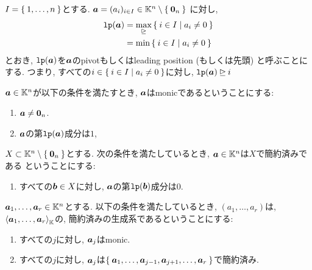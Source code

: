 \begin{definition}
$I=\Set{1,\ldots,n}$とする.
$\boldsymbol{a}=(a_i)_{i\in I}\in \mathbb{K}^n\setminus\Set{\boldsymbol{0}_n}$
に対し,
\begin{align*}
  \operatorname{\texttt{lp}}(\boldsymbol{a})
  &=\max_{\unrhd} \Set{i\in I |a_i\neq 0}\\
  &=\min\Set{i\in I |a_i\neq 0}
\end{align*}
とおき,
$\operatorname{\texttt{lp}}(\boldsymbol{a})$を$\boldsymbol{a}$のpivotもしくはleading position (もしくは先頭)
と呼ぶことにする.
つまり,
すべての$i\in \Set{i\in I |a_i\neq 0}$に対し,
$\operatorname{\texttt{lp}}(\boldsymbol{a})\unrhd i$
\end{definition}

\begin{definition}
  $\boldsymbol{a}\in\mathbb{K}^n$が以下の条件を満たすとき,
  $\boldsymbol{a}$はmonicであるということにする:
  \begin{enumerate}
  \item $\boldsymbol{a}\neq\boldsymbol{0}_n$.
  \item $\boldsymbol{a}$の第$\operatorname{\texttt{lp}}(\boldsymbol{a})$成分は$1$,
  \end{enumerate}
\end{definition}

\begin{definition}
  $X\subset \mathbb{K}^n\setminus\Set{\boldsymbol{0}_n}$とする.
  次の条件を満たしているとき,
  $\boldsymbol{a}\in\mathbb{K}^n$は$X$で簡約済みである
  ということにする:
  \begin{enumerate}
  \item すべての$\boldsymbol{b}\in X$に対し, $\boldsymbol{a}$の第$\operatorname{\texttt{lp}}(\boldsymbol{b})$成分は$0$.
  \end{enumerate}
\end{definition}

\begin{definition}
  $\boldsymbol{a}_1,\ldots,\boldsymbol{a}_{r} \in\mathbb{K}^n$とする.
  以下の条件を満たしているとき,
  $(a_1,\ldots, a_r)$は,
  $\Braket{\boldsymbol{a}_1,\ldots, \boldsymbol{a}_r}_{\mathbb{K}}$の,
  簡約済みの生成系であるということにする:
  \begin{enumerate}
  \item すべての$j$に対し, $\boldsymbol{a}_{j}$はmonic. 
  \item すべての$j$に対し, $\boldsymbol{a}_{j}$は$\Set{\boldsymbol{a}_{1},\ldots,\boldsymbol{a}_{j-1},\boldsymbol{a}_{j+1},\ldots, \boldsymbol{a}_{r}}$で簡約済み. 
  \end{enumerate}
\end{definition}



